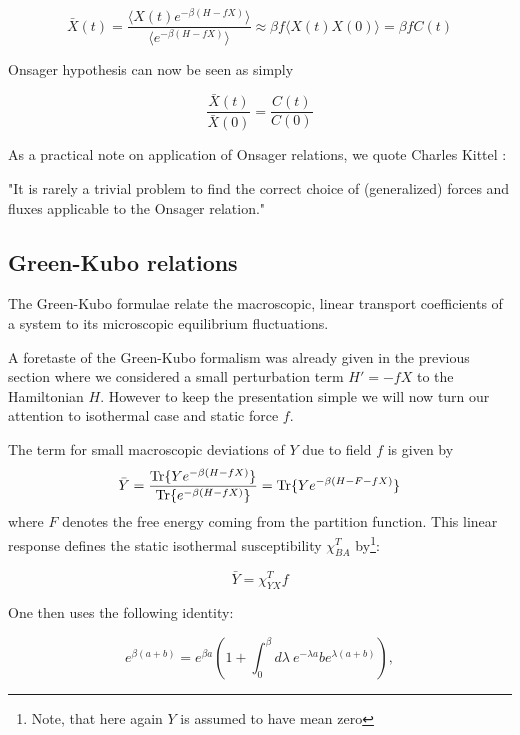 \documentclass[a4paper,12pt]{article}
\begin{document}
\begin{equation}
  \bar{X}(t)=\frac{\langle X(t) e^{-\beta (H-f X)} \rangle}{\langle e^{-\beta (H-f X)} \rangle} \approx \beta f \langle X(t)X(0) \rangle= \beta f C(t)
\end{equation}

Onsager hypothesis can now be seen as simply

\begin{equation}
  \frac{\bar{X}(t)}{\bar{X}(0)}=\frac{C(t)}{C(0)}
\end{equation}

As a practical note on application of Onsager relations, we quote Charles Kittel \cite{Kittel:817295}:

"It is rarely a trivial problem to find the correct choice of (generalized) forces and fluxes applicable to the Onsager relation."


\subsection{Green-Kubo relations}

The Green-Kubo formulae relate the macroscopic, linear transport coefficients of a system to its microscopic equilibrium fluctuations.

A foretaste of the Green-Kubo formalism was already given in the previous section where we considered a small perturbation term $H'=-f X$ to the Hamiltonian $H$. However to keep the presentation simple we will now turn our attention to isothermal case and static force $f$.

The term for small macroscopic deviations of $Y$ due to field $f$ is given by
\begin{equation}
\bar{Y}=\frac{\Tr\{ Y e^{-\beta (H-f X)} \}}{\Tr\{ e^{-\beta (H-f X)} \}} = \Tr\{ Y e^{-\beta (H - F -f X )} \}
\end{equation}
where $F$ denotes the free energy coming from the partition function. This linear response defines the static isothermal susceptibility $\chi_{BA}^T$ by\footnote{Note, that here again $Y$ is assumed to have mean zero}:

\begin{equation}
  \bar{Y} =\chi_{YX}^T f
\end{equation}

One then uses the following identity\cite{Kubo:1957cl}:

\begin{equation}
  e^{\beta (a+b) }=e^{\beta a} (1+\int_0^{\beta} d\lambda\ e^{-\lambda a} b e^{\lambda (a+b)}),
\end{equation}
\end{document}
